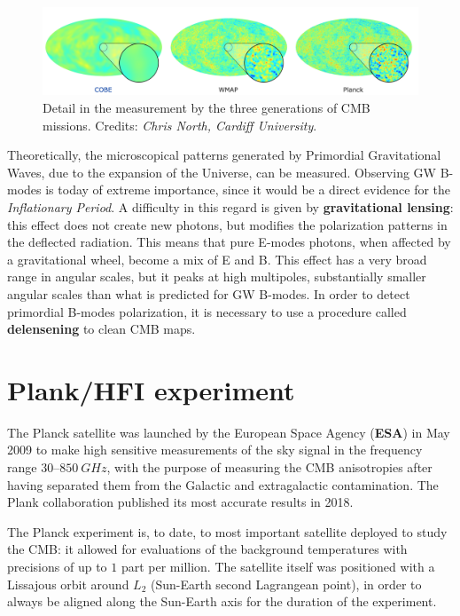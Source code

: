 \documentclass[12pt,a4paper,final]{book}			%
\begin{document}
			\begin{figure}[h!]
				\centering
				\includegraphics[scale=0.35]{figures/detail_missions_cmb.png}
				\caption{Detail in the measurement by the three generations of CMB missions. Credits: \textit{Chris North, Cardiff University}.}
				\label{detail_cmb}
			\end{figure}						 
			
			Theoretically, the microscopical patterns generated by Primordial Gravitational Waves, due to the expansion of the Universe, can be measured. Observing GW B-modes is today of extreme importance, since it would be a direct evidence for the \textit{Inflationary Period}. A difficulty in this regard is given by \textbf{gravitational lensing}: this effect does not create new photons, but modifies the polarization patterns in the deflected radiation. This means that pure E-modes photons, when affected by a gravitational wheel, become a mix of E and B. This effect has a very broad range in angular scales, but it peaks at high multipoles, substantially smaller angular scales than what is predicted for GW B-modes. In order to detect primordial B-modes polarization, it is necessary to use a procedure called \textbf{delensening} to clean CMB maps.
			 
			  
		\section{Plank/HFI experiment}\label{planck_experiment}
		
			The Planck satellite was launched by the European Space Agency (\textbf{ESA}) in May 2009 to make high sensitive measurements of the sky signal in the frequency range $30–850~\unit{GHz}$, with the purpose of measuring the CMB anisotropies after having separated them from the Galactic and extragalactic contamination. The Plank collaboration published its most accurate results in 2018. \cite{planck_overview}
			
			The Planck experiment is, to date, to most important satellite deployed to study the CMB: it allowed for evaluations of the background temperatures with precisions of up to $1$ part per million.
			The satellite itself was positioned with a Lissajous orbit around $L_2$ (Sun-Earth second Lagrangean point), in order to always be aligned along the Sun-Earth axis for the duration of the experiment. 			
			
\end{document}
